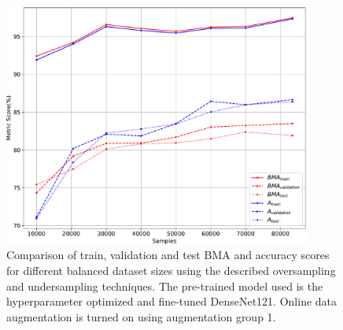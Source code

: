     \begin{figure}[ht]
        \centering
        \includegraphics[width=0.9\textwidth]{figs/densenet201_balanced_samples_metrics_comp_proper.pdf}
        \caption[Comparison of train, validation and test \ac{BMA} and accuracy scores for different balanced dataset sizes.]{Comparison of train, validation and test \ac{BMA} and accuracy scores for different balanced dataset sizes using the described oversampling and undersampling techniques. The pre-trained model used is the hyperparameter optimized and fine-tuned DenseNet121. Online data augmentation is turned on using augmentation group 1.}
        \label{fig:densenet201_balanced_samples_metrics_comp}
    \end{figure}

